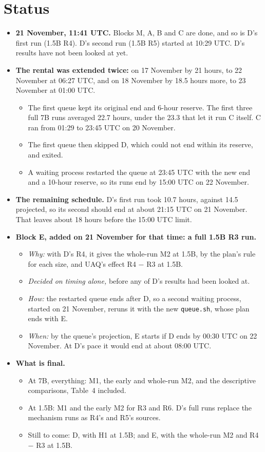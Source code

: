 \documentclass[11pt]{article}
\begin{document}
\section{Status}\label{sec:status}
\begin{itemize}
\item \textbf{21 November, 11:41 UTC.} Blocks M, A, B and C are done, and so is D's first run (1.5B R4). D's second run (1.5B R5) started at 10:29 UTC. D's results have not been looked at yet.
\item \textbf{The rental was extended twice:} on 17 November by 21 hours, to 22 November at 06:27 UTC, and on 18 November by 18.5 hours more, to 23 November at 01:00 UTC.
  \begin{itemize}
  \item The first queue kept its original end and 6-hour reserve. The first three full 7B runs averaged 22.7 hours, under the 23.3 that let it run C itself. C ran from 01:29 to 23:45 UTC on 20 November.
  \item The first queue then skipped D, which could not end within its reserve, and exited.
  \item A waiting process restarted the queue at 23:45 UTC with the new end and a 10-hour reserve, so its runs end by 15:00 UTC on 22 November.
  \end{itemize}
\item \textbf{The remaining schedule.} D's first run took 10.7 hours, against 14.5 projected, so its second should end at about 21:15 UTC on 21 November. That leaves about 18 hours before the 15:00 UTC limit.
\item \textbf{Block E, added on 21 November for that time: a full 1.5B R3 run.}
  \begin{itemize}
  \item \emph{Why:} with D's R4, it gives the whole-run M2 at 1.5B, by the plan's rule for each size, and UAQ's effect R4 $-$ R3 at 1.5B.
  \item \emph{Decided on timing alone,} before any of D's results had been looked at.
  \item \emph{How:} the restarted queue ends after D, so a second waiting process, started on 21 November, reruns it with the new \texttt{queue.sh}, whose plan ends with E.
  \item \emph{When:} by the queue's projection, E starts if D ends by 00:30 UTC on 22 November. At D's pace it would end at about 08:00 UTC.
  \end{itemize}
\item \textbf{What is final.}
  \begin{itemize}
  \item At 7B, everything: M1, the early and whole-run M2, and the descriptive comparisons, Table~4 included.
  \item At 1.5B: M1 and the early M2 for R3 and R6. D's full runs replace the mechanism runs as R4's and R5's sources.
  \item Still to come: D, with H1 at 1.5B; and E, with the whole-run M2 and R4 $-$ R3 at 1.5B.
  \end{itemize}
\end{itemize}



\end{document}
